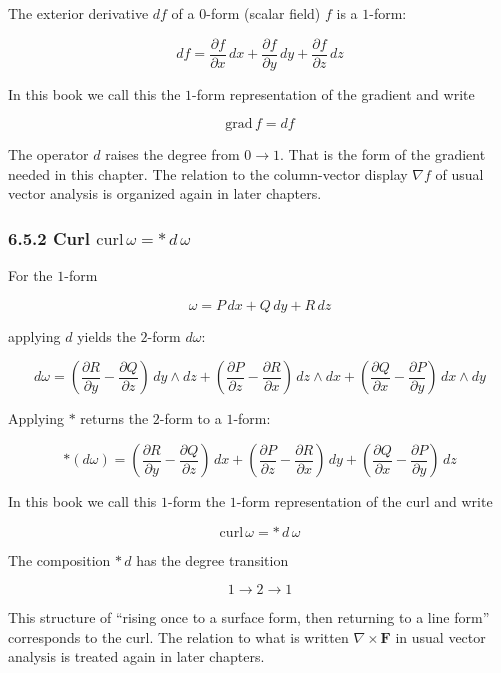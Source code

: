 \documentclass[a4paper,12pt,openany]{book}
\begin{document}
The exterior derivative \(df\) of a \(0\)-form (scalar field) \(f\) is a
\(1\)-form:

\[
df = \frac{\partial f}{\partial x}\,dx
{}+ \frac{\partial f}{\partial y}\,dy
{}+ \frac{\partial f}{\partial z}\,dz
\]

In this book we call this the \(1\)-form representation of the gradient
and write

\[
\mathrm{grad}\,f = df
\]

The operator \(d\) raises the degree from \(0 \to 1\). That is the form
of the gradient needed in this chapter. The relation to the
column-vector display \(\nabla f\) of usual vector analysis is organized
again in later chapters.

\hypertarget{curl-mathrmcurlomega-astdomega}{%
\subsubsection{\texorpdfstring{6.5.2 Curl
\(\mathrm{curl}\,\omega = \ast\,d\,\omega\)}{6.5.2 Curl \textbackslash mathrm\{curl\}\textbackslash,\textbackslash omega = \textbackslash ast\textbackslash,d\textbackslash,\textbackslash omega}}\label{curl-mathrmcurlomega-astdomega}}

For the \(1\)-form

\[
\omega = P\,dx + Q\,dy + R\,dz
\]

applying \(d\) yields the \(2\)-form \(d\omega\):

\[d\omega = (\frac{\partial R}{\partial y} - \frac{\partial Q}{\partial z})\,dy \wedge dz + (\frac{\partial P}{\partial z} - \frac{\partial R}{\partial x})\,dz \wedge dx + (\frac{\partial Q}{\partial x} - \frac{\partial P}{\partial y})\,dx \wedge dy\]

Applying \(\ast\) returns the \(2\)-form to a \(1\)-form:

\[\ast(d\omega) = (\frac{\partial R}{\partial y} - \frac{\partial Q}{\partial z})\,dx + (\frac{\partial P}{\partial z} - \frac{\partial R}{\partial x})\,dy + (\frac{\partial Q}{\partial x} - \frac{\partial P}{\partial y})\,dz\]

In this book we call this \(1\)-form the \(1\)-form representation of
the curl and write

\[\mathrm{curl}\,\omega = \ast\,d\,\omega\]

The composition \(\ast\,d\) has the degree transition

\[
1 \to 2 \to 1
\]

This structure of ``rising once to a surface form, then returning to a
line form'' corresponds to the curl. The relation to what is written
\(\nabla\times\mathbf F\) in usual vector analysis is treated again in
later chapters.
\end{document}
